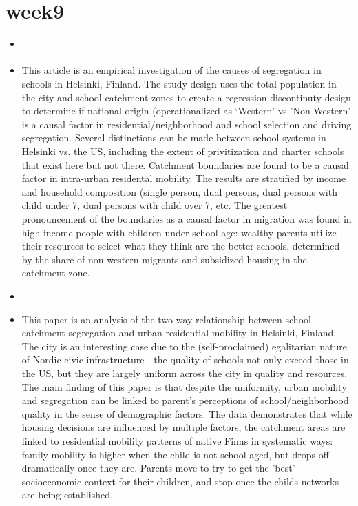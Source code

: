 \documentclass{article}
\begin{document}
\section{week9}
\begin{itemize}
\item \cite{kauppinen2022UnderstandingEffects}
\item This article is an empirical investigation of the causes of segregation in schools in Helsinki, Finland. The study design uses the total population in the city and school catchment zones to create a regression discontinuty design to determine if national origin (operationalized as `Western' vs 'Non-Western' is a causal factor in residential/neighborhood and school selection and driving segregation. Several distinctions can be made between school systems in Helsinki vs. the US, including the extent of privitization and charter schools that exist here but not there. Catchment boundaries are found to be a causal factor in intra-urban residental mobility. The results are stratified by income and household composition (single person, dual persons, dual persons with child under 7, dual persons with child over 7, etc. The greatest pronouncement of the boundaries as a causal factor in migration was found in high income people with children under school age: wealthy parents utilize their resources to select what they think are the better schools, determined by the share of non-western migrants and subsidized housing in the catchment zone.

\item \cite{bernelius2019PupilsMove}
\item This paper is an analysis of the two-way relationship between school catchment segregation and urban residential mobility in Helsinki, Finland. The city is an interesting case due to the (self-proclaimed) egalitarian nature of Nordic civic infrastructure - the quality of schools not only exceed those in the US, but they are largely uniform across the city in quality and resources. The main finding of this paper is that despite the uniformity, urban mobility and segregation can be linked to parent's perceptions of school/neighborhood quality in the sense of demographic factors. The data demonstrates that while housing decisions are influenced by multiple factors, the catchment areas are linked to residential mobility patterns of native Finns in systematic ways: family mobility is higher when the child is not school-aged, but drops off dramatically once they are. Parents move to try to get the 'best' socioeconomic context for their children, and stop once the childs networks are being established.
  
\end{itemize}
\end{document}
